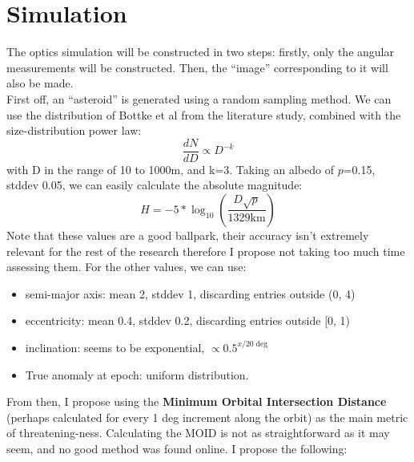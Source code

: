 \documentclass[a4paper,10pt]{article}
\begin{document}
\section{Simulation}
The optics simulation will be constructed in two steps: firstly, only the angular measurements will be constructed. Then, the ``image'' corresponding to it will also be made.\\

First off, an ``asteroid'' is generated using a random sampling method. We can use the distribution of Bottke et al from the literature study, combined with the size-distribution power law:
\begin{equation}
 \frac{dN}{dD} \propto D^{-k}
\end{equation}
with D in the range of 10 to 1000m, and k=3. Taking an albedo of $p$=0.15, stddev 0.05, we can easily calculate the absolute magnitude:
\begin{equation}
 H = -5 * \log _{10} \left(\frac{D\sqrt{p}}{1329\mathrm{km}}\right)
\end{equation}
Note that these values are a good ballpark, their accuracy isn't extremely relevant for the rest of the research therefore I propose not taking too much time assessing them. For the other values, we can use:
\begin{itemize}
 \item semi-major axis: mean 2, stddev 1, discarding entries outside (0, 4)
 \item eccentricity: mean 0.4, stddev 0.2, discarding entries outside [0, 1)
 \item inclination: seems to be exponential, $\propto 0.5^{x/20\deg}$
 \item True anomaly at epoch: uniform distribution.

\end{itemize}
From then, I propose using the \textbf{Minimum Orbital Intersection Distance} (perhaps calculated for every 1 deg increment along the orbit) as the main metric of threatening-ness. Calculating the MOID is not as straightforward as it may seem, and no good method was found online. I propose the following:
\end{document}
